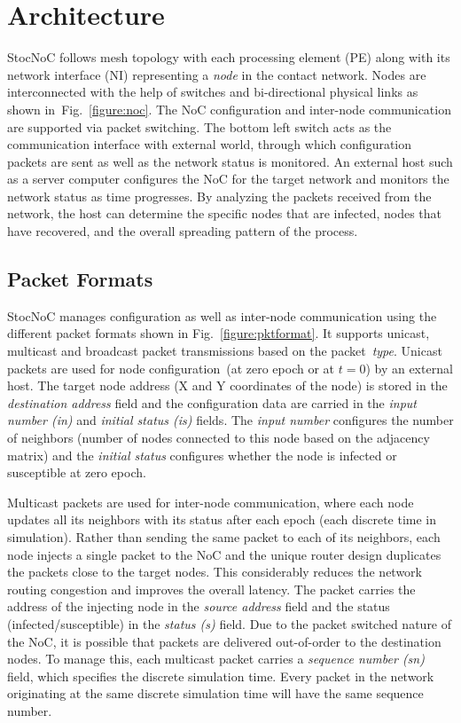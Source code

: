 \section{Architecture}
\label{sec:architecture}
StocNoC follows mesh topology with each processing element (PE) along with its network interface (NI) representing a \emph{node} in the contact network.
Nodes are interconnected with the help of switches and bi-directional physical links as shown in~Fig.~\ref{figure:noc}.
The NoC configuration and inter-node communication are supported via packet switching.
The bottom left switch acts as the communication interface with external world, through which configuration packets are sent as well as the network status is monitored.
An external host such as a server computer configures the NoC for the target network and monitors the network status as time progresses. 
By analyzing the packets received from the network, the host can determine the specific nodes that are infected, nodes that have recovered, and the overall spreading pattern of the process.



\subsection{Packet Formats}
StocNoC manages configuration as well as inter-node communication using the different packet formats shown in Fig.~\ref{figure:pktformat}.
It supports unicast, multicast and broadcast packet transmissions based on the packet~\emph{type}. 
Unicast packets are used for node configuration~(at zero epoch or at $t = 0$) by an external host. 
The target node address (X and Y coordinates of the node) is stored in the \emph{destination address} field and the configuration data are carried in the \emph{input number (in)} and \emph{initial status (is)} fields. 
The \emph{input number} configures the number of neighbors (number of nodes connected to this node based on the adjacency matrix) and the \emph{initial status} configures whether the node is infected or susceptible at zero epoch.

Multicast packets are used for inter-node communication, where each node updates all its neighbors with its status after each epoch (each discrete time in simulation).
Rather than sending the same packet to each of its neighbors, each node injects a single packet to the NoC and the unique router design duplicates the packets close to the target nodes.
This considerably reduces the network routing congestion and improves the overall latency.
The packet carries the address of the injecting node in the \emph{source address} field and the status (infected/susceptible) in the \emph{status (s)} field.
Due to the packet switched nature of the NoC, it is possible that packets are delivered out-of-order to the destination nodes.
To manage this, each multicast packet carries a \emph{sequence number (sn)} field, which specifies the discrete simulation time.
Every packet in the network originating at the same discrete simulation time will have the same sequence number.

